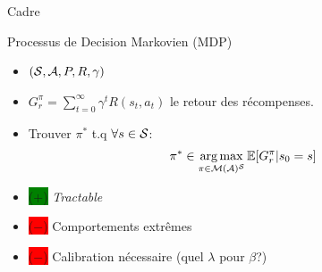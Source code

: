 \documentclass[french]{beamer}
\newcommand{\cplus}{\colorbox{green}{($+$)} }
\newcommand{\cmoins}{\colorbox{red}{($-$)} }
\begin{document}
    \begin{frame}{Cadre}
        \begin{block}{Processus de Decision Markovien (MDP)}
            \begin{itemize}
                \item $(\mathcal{S}, \mathcal{A}, P, R, \gamma)$
                \item $G_r^\pi = \sum_{t=0}^\infty \gamma^t R(s_t, a_t)$ le retour des récompenses.
                \item Trouver $\pi^*$ t.q $\forall s\in\mathcal{S}$:
                \begin{equation}
                    \label{eq:mdp}
                    \begin{array}{lcr}
                        \displaystyle \pi^* \in \operatorname*{arg\,max}_{\pi\in\mathcal{M}(\mathcal{A})^{\mathcal{S}}} \operatorname*{\mathbb{E}}[G_r^\pi | s_0=s]
                    \end{array}
                \end{equation}

            \end{itemize}
        \end{block}


        \begin{block}{}
            \begin{itemize}
                \item \cplus \textit{Tractable}
                \item \cmoins Comportements extrêmes
                \item \cmoins Calibration nécessaire (quel $\lambda$ pour $\beta$?)
            \end{itemize}
        \end{block}

    \end{frame}
\end{document}
